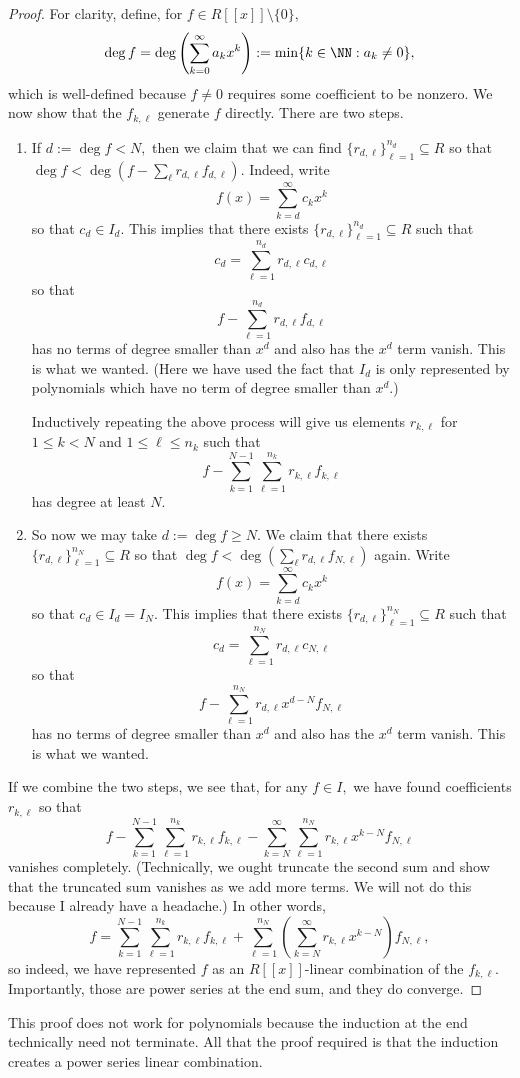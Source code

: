 \begin{proof}
	For clarity, define, for $f\in R[[x]]\setminus\{0\},$
	\[\deg f=\deg\left(\sum_{k=0}^\infty a_kx^k\right):=\min\{k\in\NN:a_k\ne0\},\]
	which is well-defined because $f\ne0$ requires some coefficient to be nonzero. We now show that the $f_{k,\ell}$ generate $f$ directly. There are two steps.
	\begin{enumerate}
		\item If $d:=\deg f<N,$ then we claim that we can find $\{r_{d,\ell}\}_{\ell=1}^{n_d}\subseteq R$ so that $\deg f<\deg\left(f-\sum_\ell r_{d,\ell} f_{d,\ell}\right).$ Indeed, write
		\[f(x)=\sum_{k=d}^\infty c_kx^k\]
		so that $c_d\in I_d.$ This implies that there exists $\{r_{d,\ell}\}_{\ell=1}^{n_d}\subseteq R$ such that
		\[c_d=\sum_{\ell=1}^{n_d}r_{d,\ell} c_{d,\ell}\]
		so that
		\[f-\sum_{\ell=1}^{n_d}r_{d,\ell} f_{d,\ell}\]
		has no terms of degree smaller than $x^d$ and also has the $x^d$ term vanish. This is what we wanted. (Here we have used the fact that $I_d$ is only represented by polynomials which have no term of degree smaller than $x^d.$)

		Inductively repeating the above process will give us elements $r_{k,\ell}$ for $1\le k<N$ and $1\le\ell\le n_k$ such that
		\[f-\sum_{k=1}^{N-1}\sum_{\ell=1}^{n_k}r_{k,\ell}f_{k,\ell}\]
		has degree at least $N.$

		\item So now we may take $d:=\deg f\ge N.$ We claim that there exists $\{r_{d,\ell}\}_{\ell=1}^{n_N}\subseteq R$ so that $\deg f<\deg\left(\sum_\ell r_{d,\ell}f_{N,\ell}\right)$ again. Write
		\[f(x)=\sum_{k=d}^\infty c_kx^k\]
		so that $c_d\in I_d=I_N.$ This implies that there exists $\{r_{d,\ell}\}_{\ell=1}^{n_N}\subseteq R$ such that
		\[c_d=\sum_{\ell=1}^{n_N}r_{d,\ell} c_{N,\ell}\]
		so that
		\[f-\sum_{\ell=1}^{n_N}r_{d,\ell}x^{d-N}f_{N,\ell}\]
		has no terms of degree smaller than $x^d$ and also has the $x^d$ term vanish. This is what we wanted.
	\end{enumerate}
	If we combine the two steps, we see that, for any $f\in I,$ we have found coefficients $r_{k,\ell}$ so that
	\[f-\sum_{k=1}^{N-1}\sum_{\ell=1}^{n_k}r_{k,\ell}f_{k,\ell}-\sum_{k=N}^\infty\sum_{\ell=1}^{n_N}r_{k,\ell}x^{k-N}f_{N,\ell}\]
	vanishes completely. (Technically, we ought truncate the second sum and show that the truncated sum vanishes as we add more terms. We will not do this because I already have a headache.) In other words,
	\[f=\sum_{k=1}^{N-1}\sum_{\ell=1}^{n_k}r_{k,\ell}f_{k,\ell}+\sum_{\ell=1}^{n_N}\left(\sum_{k=N}^\infty r_{k,\ell}x^{k-N}\right)f_{N,\ell},\]
	so indeed, we have represented $f$ as an $R[[x]]$-linear combination of the $f_{k,\ell}.$ Importantly, those are power series at the end sum, and they do converge.
\end{proof}
\begin{remark}
	This proof does not work for polynomials because the induction at the end technically need not terminate. All that the proof required is that the induction creates a power series linear combination.
\end{remark}

